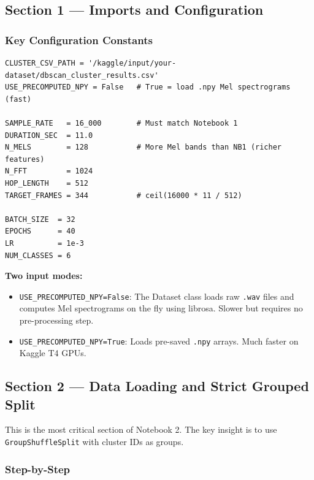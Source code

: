 \documentclass[12pt,a4paper]{article}
\begin{document}
\subsection{Section 1 --- Imports and Configuration}

\subsubsection{Key Configuration Constants}

\begin{lstlisting}
CLUSTER_CSV_PATH = '/kaggle/input/your-dataset/dbscan_cluster_results.csv'
USE_PRECOMPUTED_NPY = False   # True = load .npy Mel spectrograms (fast)

SAMPLE_RATE   = 16_000        # Must match Notebook 1
DURATION_SEC  = 11.0
N_MELS        = 128           # More Mel bands than NB1 (richer features)
N_FFT         = 1024
HOP_LENGTH    = 512
TARGET_FRAMES = 344           # ceil(16000 * 11 / 512)

BATCH_SIZE  = 32
EPOCHS      = 40
LR          = 1e-3
NUM_CLASSES = 6
\end{lstlisting}

\begin{infobox}
\textbf{Two input modes:}
\begin{itemize}[nosep]
  \item \texttt{USE\_PRECOMPUTED\_NPY=False}: The Dataset class loads raw \texttt{.wav} files and computes Mel spectrograms on the fly using librosa. Slower but requires no pre-processing step.
  \item \texttt{USE\_PRECOMPUTED\_NPY=True}: Loads pre-saved \texttt{.npy} arrays. Much faster on Kaggle T4 GPUs.
\end{itemize}
\end{infobox}

\subsection{Section 2 --- Data Loading and Strict Grouped Split}

This is the most critical section of Notebook 2. The key insight is to use \texttt{GroupShuffleSplit} with cluster IDs as groups.

\subsubsection{Step-by-Step}
\end{document}
